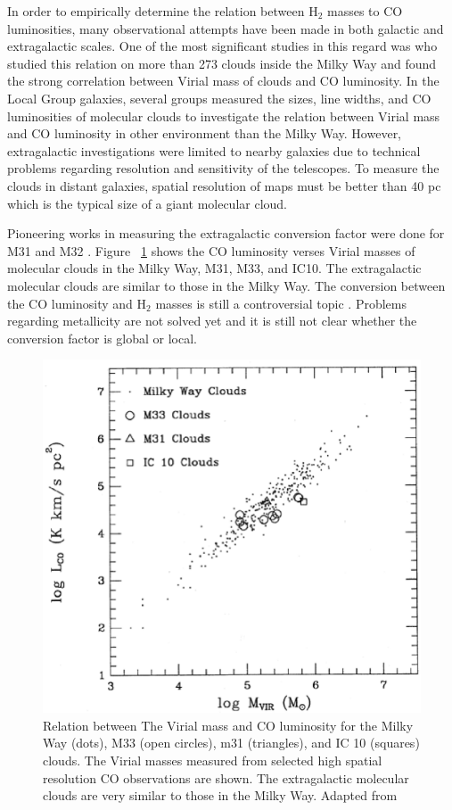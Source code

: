 In order to empirically determine the relation between H$_2$ masses to CO luminosities, many observational attempts have been made in both galactic and extragalactic scales. One of the most significant studies in this regard was \cite{Solomon87} who studied this relation on more than 273 clouds inside the Milky Way and found the strong correlation between Virial mass of clouds and CO luminosity. In the Local Group galaxies, several groups measured the sizes, line widths, and CO luminosities of molecular clouds to investigate the relation between Virial mass and CO luminosity in other environment than the Milky Way. However, extragalactic investigations were limited to nearby galaxies due to technical problems regarding resolution and sensitivity of the telescopes. To measure the clouds in distant galaxies, spatial resolution of maps must be better than 40 pc which is the typical size of a giant molecular cloud. 

Pioneering works in measuring the extragalactic conversion factor were done for M31 and M32 \citep[e.g.,][]{Wilson89, Wilson90}. Figure {~\ref{fig: mco}} shows the CO luminosity verses Virial masses of molecular clouds in the Milky Way, M31, M33, and IC10. The extragalactic molecular clouds are similar to those in the Milky Way. The conversion between the CO luminosity and H$_2$ masses is still a controversial topic \citep[e.g.][]{Narayanan11, Bolato13, Sandstrom13}. Problems regarding metallicity are not solved yet and it is still not clear whether the conversion factor is global or local. 

\begin{figure}[h]
\label{fig: mco}
\centering
\includegraphics[width=16cm]{../image_intro/mvirial_lco.eps}
\caption{Relation between The Virial mass and CO luminosity for the Milky Way (dots), M33 (open circles), m31 (triangles), and IC 10 (squares) clouds. The Virial masses measured from selected high spatial resolution CO observations are shown. The extragalactic molecular clouds are very similar to those in the Milky Way. Adapted from \cite{Young91}}
\end{figure}
 


